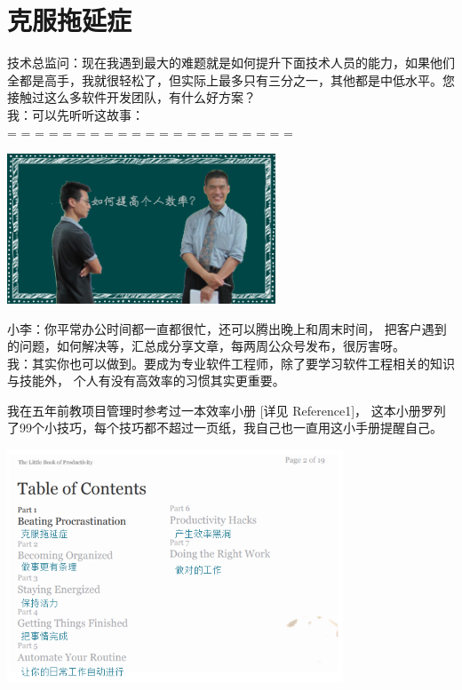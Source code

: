 \chapter{克服拖延症} %


技术总监问：现在我遇到最大的难题就是如何提升下面技术人员的能力，如果他们全都是高手，我就很轻松了，但实际上最多只有三分之一，其他都是中低水平。您接触过这么多软件开发团队，有什么好方案？\\
我：可以先听听这故事：\\


= = = = = = = = = = = = = = = = = = = = =



\includegraphics[width=8cm]{小李图.png}

小李：你平常办公时间都一直都很忙，还可以腾出晚上和周末时间，
把客户遇到的问题，如何解决等，汇总成分享文章，每两周公众号发布，很厉害呀。\\
我：其实你也可以做到。要成为专业软件工程师，除了要学习软件工程相关的知识与技能外，
个人有没有高效率的习惯其实更重要。

我在五年前教项目管理时参考过一本效率小册 {[}详见 Reference1{]}，
这本小册罗列了99个小技巧，每个技巧都不超过一页纸，我自己也一直用这小手册提醒自己。


\includegraphics[width=10cm]{超效率目录.png}

